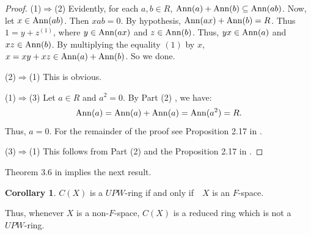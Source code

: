 \documentclass{amsart}
\theoremstyle{definition}
\theoremstyle{remark}
\numberwithin{equation}{section}
\newcommand{\Ann}{{\rm Ann}}
\def\ifif {if and only if\ \ }
\theoremstyle{definition}\newtheorem{thm}{Theorem}[section]
\theoremstyle{definition}\newtheorem{cor}[thm]{Corollary}
\theoremstyle{definition}\newtheorem{lem}[thm]{Lemma}
\theoremstyle{definition}\newtheorem{prop}[thm]{Proposition}
\theoremstyle{definition}\newtheorem{defn}[thm]{Definition}
\theoremstyle{definition}\newtheorem{Rem}[thm]{Remark}
\theoremstyle{remark}\newtheorem{rem}[thm]{Remark}
\theoremstyle{definition}\newtheorem{exam}[thm]{Example}
\theoremstyle{definition}\newtheorem{qu}[thm]{question}
\begin{document}
\begin{proof}
(1)$\Rightarrow$(2)  Evidently, for each $a, b\in R$, $\Ann(a)+\Ann(b)\subseteq\Ann(ab)$. Now, let $x\in\Ann(ab)$. Then $xab=0$. By hypothesis, $\Ann(ax)+\Ann(b)=R$. Thus $1=y+z^{(1)}$, where $y\in\Ann(ax)$ and $z\in\Ann(b)$. Thus, $yx\in\Ann(a)$ and $xz\in\Ann(b)$. By multiplying  the equality $(1)$ by $x$,  $x=xy+ xz\in\Ann(a)+\Ann(b)$. So we done.

(2)$\Rightarrow$(1) This is obvious.

(1)$\Rightarrow$(3) Let $a\in R$ and $a^2=0$. By Part (2) , we have: \[\Ann(a)=\Ann(a)+\Ann(a)=\Ann(a^2)=R.\] Thus, $a=0$. For the remainder of the proof see Proposition 2.17 in \cite{AlTaTa}.

(3)$\Rightarrow$(1) This follows from Part (2) and the Proposition 2.17 in \cite{AlTaTa}.
\end{proof}
Theorem 3.6 in \cite{AlTaTa} implies the next result.
\begin{cor}\label{exa}
$C(X)$ is a $UPW$-ring \ifif $X$ is an $F$-space. 
\end{cor}
Thus,  whenever $X$ is a non-$F$-space, $C(X)$ is a reduced ring which is not a $UPW$-ring.
\end{document}
